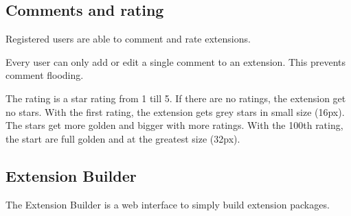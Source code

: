 \subsection[sec:comments and rating]{Comments and rating}

Registered users are able to comment and rate extensions.

Every user can only add or edit a single comment to an extension.
This prevents comment flooding.

The rating is a star rating from 1 till 5.
If there are no ratings, the extension get no stars.
With the first rating, the extension gets grey stars in small size (16px).
The stars get more golden and bigger with more ratings.
With the 100th rating, the start are full golden and at the greatest size (32px).

\subsection[sec:extension builder]{Extension Builder}

The Extension Builder is a web interface to simply build extension packages.
